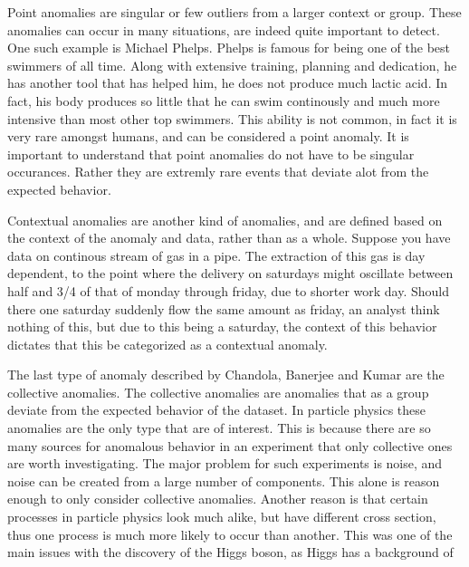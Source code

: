 Point anomalies are singular or few outliers from a larger context or group. These anomalies can occur in many situations, are 
indeed quite important to detect. One such example is Michael Phelps. Phelps is famous for being one of the best swimmers of all time. 
Along with extensive training, planning and dedication, he has another tool that has helped him, he does not produce much lactic acid. 
In fact, his body produces so little that he can swim continously and much more intensive than most other top swimmers. This ability 
is not common, in fact it is very rare amongst humans, and can be considered a point anomaly. It is important to understand that point anomalies
do not have to be singular occurances. Rather they are extremly rare events that deviate alot from the expected behavior. \par
Contextual anomalies are another kind of anomalies, and are defined based on the context of the anomaly and data, rather than as a whole. 
Suppose you have data on continous stream of gas in a pipe. The extraction of this gas is day dependent, to the point where the delivery 
on saturdays might oscillate between half and 3/4 of that of monday through friday, due to shorter work day. Should there one saturday 
suddenly flow the same amount as friday, an analyst think nothing of this, but due to this being a saturday, the context of this behavior 
dictates that this be categorized as a contextual anomaly. \par 
The last type of anomaly described by Chandola, Banerjee and Kumar \cite{anom_detec} are the collective anomalies. The collective anomalies 
are anomalies that as a group deviate from the expected behavior of the dataset. In particle physics these anomalies are the only type that 
are of interest. This is because there are so many sources for anomalous behavior in an experiment that only collective ones are worth investigating. 
The major problem for such experiments is noise, and noise can be created from a large number of components. This alone is reason enough to 
only consider collective anomalies. Another reason is that certain processes in particle physics look much alike, but have different cross section,
thus one process is much more likely to occur than another. This was one of the main issues with the discovery of the Higgs boson, as Higgs has a 
background  of 
